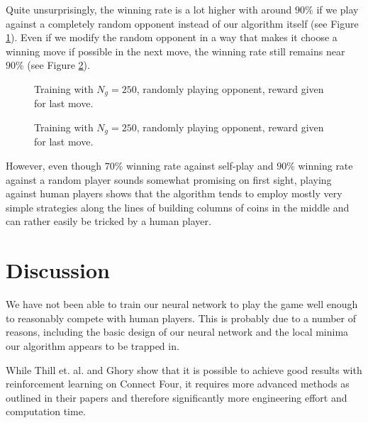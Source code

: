 \documentclass[10pt,twocolumn,letterpaper]{article}
\begin{document}
Quite unsurprisingly, the winning rate is a lot higher with around $90 \%$ if we play against a completely random opponent instead of our algorithm itself (see Figure \ref{fig:last_move_random}).
Even if we modify the random opponent in a way that makes it choose a winning move if possible in the next move, the winning rate still remains near $90 \%$ (see Figure \ref{fig:last_move_random_with_winning_move}).
\begin{figure}[t]
    \begin{center}
		\noindent
		\makebox[3.25in]{
	   		
		}
	\end{center}
    \caption{Training with $N_g=250$, randomly playing opponent, reward given for last move.}
	\label{fig:last_move_random}
\end{figure}
\begin{figure}[t]
    \begin{center}
		\noindent
		\makebox[3.25in]{
	   		
		}
	\end{center}
    \caption{Training with $N_g=250$, randomly playing opponent, reward given for last move.}
	\label{fig:last_move_random_with_winning_move}
\end{figure}

However, even though $70\%$ winning rate against self-play and $90\%$ winning rate against a random player sounds somewhat promising on first sight, playing against human players shows that the algorithm tends to employ mostly very simple strategies along the lines of building columns of coins in the middle and can rather easily be tricked by a human player.

\section{Discussion}

We have not been able to train our neural network to play
the game well enough to reasonably compete with human players.
This is probably due to a number of reasons, including the basic design of
our neural network and the local minima our algorithm appears to be trapped in.

While Thill et. al. \cite{Thill} and Ghory \cite{Ghory} show that it is possible to
achieve good results with reinforcement learning on Connect Four, it requires
more advanced methods as outlined in their papers and therefore significantly more
engineering effort and computation time.
\end{document}

